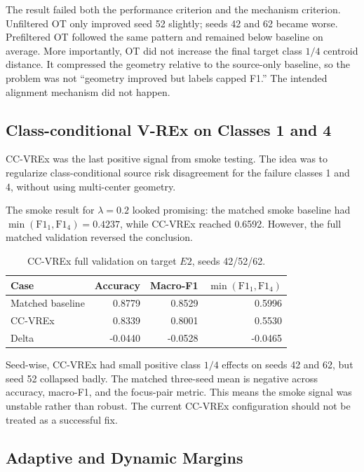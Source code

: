 \documentclass[11pt]{article}
\begin{document}
The result failed both the performance criterion and the mechanism criterion. Unfiltered OT only improved seed 52 slightly; seeds 42 and 62 became worse. Prefiltered OT followed the same pattern and remained below baseline on average. More importantly, OT did not increase the final target class $1/4$ centroid distance. It compressed the geometry relative to the source-only baseline, so the problem was not ``geometry improved but labels capped F1.'' The intended alignment mechanism did not happen.

\subsection{Class-conditional V-REx on Classes 1 and 4}

CC-VREx was the last positive signal from smoke testing. The idea was to regularize class-conditional source risk disagreement for the failure classes 1 and 4, without using multi-center geometry.

The smoke result for $\lambda=0.2$ looked promising: the matched smoke baseline had $\min(\mathrm{F1}_1,\mathrm{F1}_4)=0.4237$, while CC-VREx reached 0.6592. However, the full matched validation reversed the conclusion.

\begin{table}[H]
\centering
\small
\caption{CC-VREx full validation on target $E2$, seeds 42/52/62.}
\label{tab:ccvrex}
\begin{tabular}{lrrr}
\toprule
Case & Accuracy & Macro-F1 & $\min(\mathrm{F1}_1,\mathrm{F1}_4)$ \\
\midrule
Matched baseline & 0.8779 & 0.8529 & 0.5996 \\
CC-VREx & 0.8339 & 0.8001 & 0.5530 \\
Delta & -0.0440 & -0.0528 & -0.0465 \\
\bottomrule
\end{tabular}
\end{table}

Seed-wise, CC-VREx had small positive class $1/4$ effects on seeds 42 and 62, but seed 52 collapsed badly. The matched three-seed mean is negative across accuracy, macro-F1, and the focus-pair metric. This means the smoke signal was unstable rather than robust. The current CC-VREx configuration should not be treated as a successful fix.

\subsection{Adaptive and Dynamic Margins}
\end{document}
